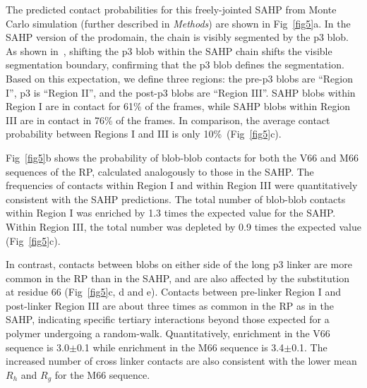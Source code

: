\documentclass[10pt,letterpaper]{article}
\begin{document}
The predicted contact probabilities for this freely-jointed SAHP from Monte Carlo simulation (further described in {\it Methods}) are shown in Fig~\ref{fig5}a. In the SAHP version of the prodomain, the chain is visibly segmented by the p3 blob. As shown in~, shifting the p3 blob within the SAHP chain shifts the visible segmentation boundary, confirming that the p3 blob defines the segmentation. Based on this expectation, we define three regions: the pre-p3 blobs are ``Region I'', p3 is ``Region II'', and the post-p3 blobs are ``Region III''. SAHP blobs within Region I are in contact for 61\% of the frames, while SAHP blobs within Region III are in contact in 76\% of the frames. In comparison, the average contact probability between Regions I and III is only 10\%~(Fig~\ref{fig5}c).

Fig~\ref{fig5}b shows the probability of blob-blob contacts for both the V66 and M66 sequences of the RP, calculated analogously to those in the SAHP. The frequencies of contacts within Region I and within Region III were quantitatively consistent with the SAHP predictions. The total number of blob-blob contacts within Region I was enriched by 1.3 times the expected value for the SAHP. Within Region III, the total number was depleted by 0.9 times the expected value (Fig~\ref{fig5}c).

In contrast, contacts between blobs on either side of the long p3 linker are more common in the RP than in the SAHP, and are also affected by the substitution at residue 66 (Fig~\ref{fig5}c, d and e). Contacts between pre-linker Region I and post-linker Region III are about three times as common in the RP as in the SAHP, indicating specific tertiary interactions beyond those expected for a polymer undergoing a random-walk. Quantitatively, enrichment in the V66 sequence is 3.0$\pm$0.1 while enrichment in the M66 sequence is 3.4$\pm$0.1. The increased number of cross linker contacts are also consistent with the lower mean $R_h$ and $R_g$ for the M66 sequence.
\end{document}

